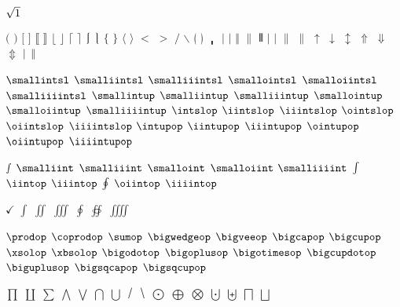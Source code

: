 \documentclass[captions=tableheading]{scrartcl}
\begin{document}
$\sqrtsign{1}$

$($
$)$
$[$
$]$
$\lBrack$
\let\dlb\lBrack
$\rBrack$
\let\drb\rBrack
$\lfloor$
$\rfloor$
$\lceil$
$\rceil$
$\lmoustache$
$\rmoustache$
$\lbrace$
$\rbrace$
$\langle$
$\rangle$
$<$
$>$
$/$
$\backslash$
$\lgroup$
$\rgroup$
$\bracevert$
$|$
$\vert$
$\Vert$
$\|$
$\Vvert$
$\lvert$
$\rvert$
$\lVert$
$\rVert$
$\uparrow$
$\downarrow$
$\updownarrow$
$\Uparrow$
$\Downarrow$
$\Updownarrow$
$\arrowvert$
$\Arrowvert$

$\smallintsl$
$\smalliintsl$
$\smalliiintsl$
$\smallointsl$
$\smalloiintsl$
$\smalliiiintsl$
$\smallintup$
$\smalliintup$
$\smalliiintup$
$\smallointup$
$\smalloiintup$
$\smalliiiintup$
$\intslop$
$\iintslop$
$\iiintslop$
$\ointslop$
$\oiintslop$
$\iiiintslop$
$\intupop$
$\iintupop$
$\iiintupop$
$\ointupop$
$\oiintupop$
$\iiiintupop$

    $\smallint$
    $\smalliint$
    $\smalliiint$
    $\smalloint$
    $\smalloiint$
    $\smalliiiint$
    $\intop$
    $\iintop$
    $\iiintop$
    $\ointop$
    $\oiintop$
    $\iiiintop$

$\checkmark$
$\int$
$\iint$
$\iiint$
$\oint$
$\oiint$
$\iiiint$

$\prodop$
$\coprodop$
$\sumop$
$\bigwedgeop$
$\bigveeop$
$\bigcapop$
$\bigcupop$
$\xsolop$
$\xbsolop$
$\bigodotop$
$\bigoplusop$
$\bigotimesop$
$\bigcupdotop$
$\biguplusop$
$\bigsqcapop$
$\bigsqcupop$

$\prod$
$\coprod$
$\sum$
$\bigwedge$
$\bigvee$
$\bigcap$
$\bigcup$
$\xsol$
$\xbsol$
$\bigodot$
$\bigoplus$
$\bigotimes$
$\bigcupdot$
$\biguplus$
$\bigsqcap$
$\bigsqcup$

\end{document}
